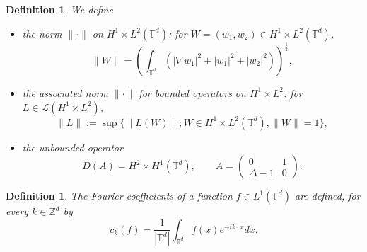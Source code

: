 \documentclass[a4paper]{article}
\theoremstyle{plain}
\newtheorem{definition}[theorem]{Definition}
\newcommand{\T}{\mathbb{T}}
\begin{document}
\begin{definition}
We define
\begin{itemize}[topsep=0cm, parsep=0cm, itemsep=0cm]
%
%
\item the norm $\|\cdot\|$ on $H^1 \times L^2(\T^d)$: for $W=(w_1,w_2) \in H^1 \times L^2(\T^d)$,
\begin{equation} \label{normalpha}
\|W\| = 
\left( \int_{\T^d} 
\left( 
|\nabla w_1 |^2  + 
|w_1|^2 + 
|w_2|^2  \right)  \right)^{\frac 12},
\end{equation}

%
\item the associated norm $\|\cdot\|$ for bounded operators on $H^1 \times L^2$:
for $L \in \mathcal{L}(H^1 \times L^2)$,
\begin{equation} \label{opnormalpha}
    \| L\|:=\sup\{ \|L(W)\| ; W \in H^1 \times L^2(\T^d), \|W\|=1 \},
\end{equation}
%
\item the unbounded operator 
\begin{equation} \label{def:Aalpha}
D(A)=H^2 \times H^1(\T^d), \qquad A = \begin{pmatrix}
    0 & 1 \\ \Delta-1 & 0 
\end{pmatrix}.
\end{equation}
\end{itemize}
\end{definition}

\begin{definition}
The Fourier coefficients of a function $f \in L^1(\T^d)$ are defined, for every $k \in \mathbb{Z}^d$ by
$$
c_k(f)=\frac{1}{|\T^d|} \int_{\T^d} f(x) e^{-i k \cdot x} dx. $$
\end{definition}
\end{document}
